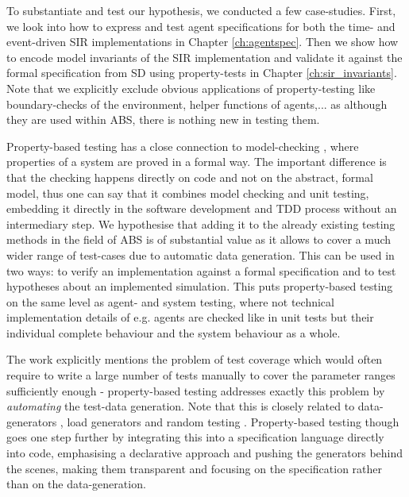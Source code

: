 To substantiate and test our hypothesis, we conducted a few case-studies. First, we look into how to express and test agent specifications for both the time- and event-driven SIR implementations in Chapter \ref{ch:agentspec}. Then we show how to encode model invariants of the SIR implementation and validate it against the formal specification from SD using property-tests in Chapter \ref{ch:sir_invariants}. Note that we explicitly exclude obvious applications of property-testing like boundary-checks of the environment, helper functions of agents,... as although they are used within ABS, there is nothing new in testing them.

\medskip

Property-based testing has a close connection to model-checking \cite{mcmillan_symbolic_1993}, where properties of a system are proved in a formal way. The important difference is that the checking happens directly on code and not on the abstract, formal model, thus one can say that it combines model checking and unit testing, embedding it directly in the software development and TDD process without an intermediary step. We hypothesise that adding it to the already existing testing methods in the field of ABS is of substantial value as it allows to cover a much wider range of test-cases due to automatic data generation. This can be used in two ways: to verify an implementation against a formal specification and to test hypotheses about an implemented simulation. This puts property-based testing on the same level as agent- and system testing, where not technical implementation details of e.g. agents are checked like in unit tests but their individual complete behaviour and the system behaviour as a whole.

The work \cite{onggo_test-driven_2016} explicitly mentions the problem of test coverage which would often require to write a large number of tests manually to cover the parameter ranges sufficiently enough - property-based testing addresses exactly this problem by \textit{automating} the test-data generation. Note that this is closely related to data-generators \cite{gurcan_generic_2013}, load generators and random testing \cite{burnstein_practical_2010}. Property-based testing though goes one step further by integrating this into a specification language directly into code, emphasising a declarative approach and pushing the generators behind the scenes, making them transparent and focusing on the specification rather than on the data-generation. 